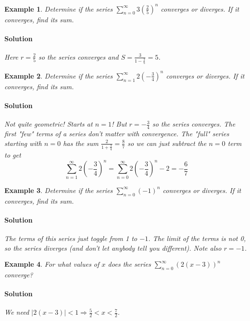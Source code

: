 \documentclass[letterpaper, 11pt, openany]{book}
\theoremstyle{mytheoremstyle}
\theoremstyle{myexamplestyle}
\newtheorem{example}{Example}[section]
\newenvironment{solution}{\paragraph{\sffamily \smaller \fontseries{b}\selectfont Solution}}{\hfill\faSquare}
\begin{document}
\begin{example}\label{e:seriesgeo}
    Determine if the series $\displaystyle \sum_{n=0}^{\infty} 3 \left( \frac{2}{5} \right)^{n}$ converges or diverges. If it converges, find its sum.
    
    \begin{solution}
        Here $r = \frac{2}{5}$ so the series converges and $S = \frac{3}{1 - \frac{2}{5}} = 5$.
    \end{solution}
\end{example}

\begin{example}\label{e:seriesgeoconv}
    Determine if the series $\displaystyle \sum_{n=1}^{\infty} 2\left( -\frac{3}{4} \right)^{n}$ converges or diverges. If it converges, find its sum.
    
    \begin{solution}
        Not quite geometric! Starts at $n=1$! But $r = -\frac{3}{4}$ so the series converges. The first "few" terms of a series don't matter with convergence. The "full" series starting with $n=0$ has the sum $\frac{2}{1 + \frac{3}{4}} = \frac{8}{7}$ so we can just subtract the $n=0$ term to get
        \[\sum_{n=1}^{\infty} 2\left( -\frac{3}{4} \right)^{n} = \sum_{n=0}^{\infty} 2\left( -\frac{3}{4} \right)^{n} - 2 = -\frac{6}{7}\]
    \end{solution}
\end{example}

\begin{example}\label{e:seriesGrandis}
    Determine if the series $\displaystyle \sum_{n=0}^{\infty} \left( -1 \right)^{n}$ converges or diverges. If it converges, find its sum.
    
    \begin{solution}
        The terms of this series just toggle from 1 to $-1$. The limit of the terms is not 0, so the series diverges (\textit{and don't let anybody tell you different}). Note also $r=-1$.
    \end{solution}
\end{example}

\begin{example}\label{e:seriesxvals}
    For what values of $x$ does the series $\displaystyle \sum_{n=0}^{\infty} \left( 2(x-3) \right)^{n}$ converge?
    
    \begin{solution}
        We need $|2(x-3)| < 1 \Rightarrow \frac{5}{2} < x < \frac{7}{2}$.
    \end{solution}
\end{example}
\end{document}
